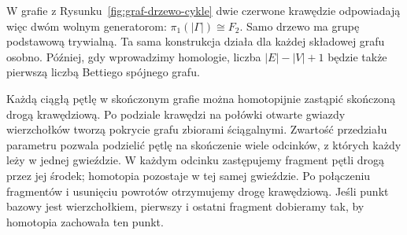 W grafie z Rysunku~\ref{fig:graf-drzewo-cykle} dwie czerwone
krawędzie odpowiadają więc dwóm wolnym generatorom:
$\pi_1(|\Gamma|)\cong F_2$. Samo drzewo ma grupę
podstawową trywialną. Ta sama konstrukcja działa dla
każdej składowej grafu osobno. Później, gdy wprowadzimy
homologie, liczba $|E|-|V|+1$ będzie także pierwszą liczbą
Bettiego spójnego grafu.

Każdą ciągłą pętlę w skończonym grafie można homotopijnie
zastąpić skończoną drogą krawędziową. Po podziale krawędzi
na połówki otwarte gwiazdy wierzchołków tworzą pokrycie
grafu zbiorami ściągalnymi. Zwartość przedziału parametru
pozwala podzielić pętlę na skończenie wiele odcinków, z
których każdy leży w jednej gwieździe. W każdym odcinku
zastępujemy fragment pętli drogą przez jej środek; homotopia
pozostaje w tej samej gwieździe. Po połączeniu fragmentów
i usunięciu powrotów otrzymujemy drogę krawędziową.
Jeśli punkt bazowy jest wierzchołkiem, pierwszy i ostatni
fragment dobieramy tak, by homotopia zachowała ten punkt.

